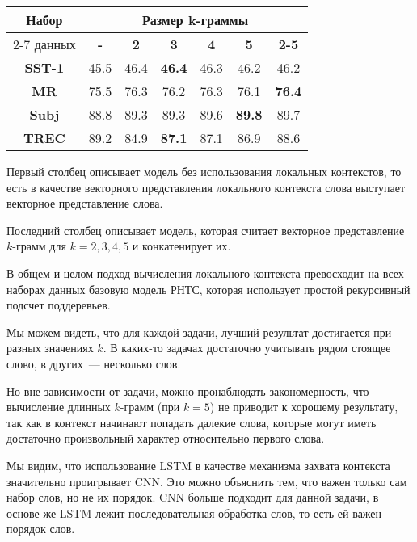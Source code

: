\begin{minipage}{\linewidth}
 \label{tab:title} 
\begin{tabular}{|c|c|c|c|c|c|c|}
\hline
\multirow{2}{*}{Набор}   &         \multicolumn{6}{c|}{Размер k-граммы} \\ \cline{2-7} 
     данных              & \textbf{-} & \textbf{2} & \textbf{3} & \textbf{4} & \textbf{5} & \textbf{2-5} \\ \hline
\textbf{SST-1}           &  45.5    & 46.4     &\textbf{46.4} & 46.3     &  46.2    & 46.2           \\  \hline
\textbf{MR}              &  75.5    & 76.3     & 76.2     & 76.3   & 76.1     & \textbf{76.4} \\ \hline
\textbf{Subj}            &  88.8    & 89.3     & 89.3     & 89.6   &\textbf{89.8}    & 89.7 \\ \hline
\textbf{TREC}            &  89.2    & 84.9     & \textbf{87.1}     & 87.1     &  86.9    & 88.6  \\ \hline
\end{tabular}
\vspace{5mm}
\end{minipage}
\vspace{5mm}

Первый столбец описывает модель без использования локальных контекстов, то есть в качестве векторного представления локального контекста слова выступает векторное представление слова.

Последний столбец описывает модель, которая считает векторное представление $k$-грамм для $k=2,3,4,5$ и конкатенирует их.

В общем и целом подход вычисления локального контекста превосходит на всех наборах данных базовую модель РНТС\cite{socher-EtAl:2013:EMNLP}, которая использует простой рекурсивный подсчет поддеревьев.

Мы можем видеть, что для каждой задачи, лучший результат достигается при разных значениях $k$. В каких-то задачах достаточно учитывать рядом стоящее слово, в других~--- несколько слов.

Но вне зависимости от задачи, можно пронаблюдать закономерность, что 
вычисление длинных $k$-грамм (при $k=5$) не приводит к хорошему результату, 
так как в контекст начинают попадать далекие слова, 
которые могут иметь достаточно произвольный характер относительно первого слова.

Мы видим, что использование LSTM в качестве механизма захвата контекста значительно проигрывает CNN.
Это можно объяснить тем, что важен только сам набор слов, но не их порядок. 
CNN больше подходит для данной задачи, в основе же LSTM лежит последовательная обработка слов, то есть ей важен порядок слов.

